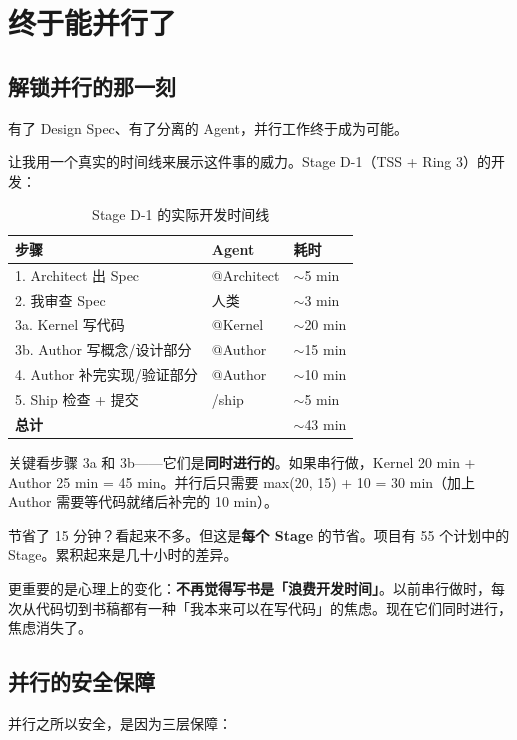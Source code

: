 \chapter{终于能并行了}

\section{解锁并行的那一刻}

有了 Design Spec、有了分离的 Agent，并行工作终于成为可能。

让我用一个真实的时间线来展示这件事的威力。Stage D-1（TSS + Ring 3）的开发：

\begin{table}[H]
\centering
\begin{tabular}{lll}
\toprule
\textbf{步骤} & \textbf{Agent} & \textbf{耗时} \\
\midrule
1. Architect 出 Spec & @Architect & $\sim$5 min \\
2. 我审查 Spec & 人类 & $\sim$3 min \\
3a. Kernel 写代码 & @Kernel & $\sim$20 min \\
3b. Author 写概念/设计部分 & @Author & $\sim$15 min \\
4. Author 补完实现/验证部分 & @Author & $\sim$10 min \\
5. Ship 检查 + 提交 & /ship & $\sim$5 min \\
\midrule
\textbf{总计} & & $\sim$43 min \\
\bottomrule
\end{tabular}
\caption{Stage D-1 的实际开发时间线}
\end{table}

关键看步骤 3a 和 3b——它们是\textbf{同时进行的}。如果串行做，Kernel 20 min + Author 25 min = 45 min。并行后只需要 max(20, 15) + 10 = 30 min（加上 Author 需要等代码就绪后补完的 10 min）。

节省了 15 分钟？看起来不多。但这是\textbf{每个 Stage} 的节省。项目有 55 个计划中的 Stage。累积起来是几十小时的差异。

更重要的是心理上的变化：\textbf{不再觉得写书是「浪费开发时间」}。以前串行做时，每次从代码切到书稿都有一种「我本来可以在写代码」的焦虑。现在它们同时进行，焦虑消失了。

\section{并行的安全保障}

并行之所以安全，是因为三层保障：

